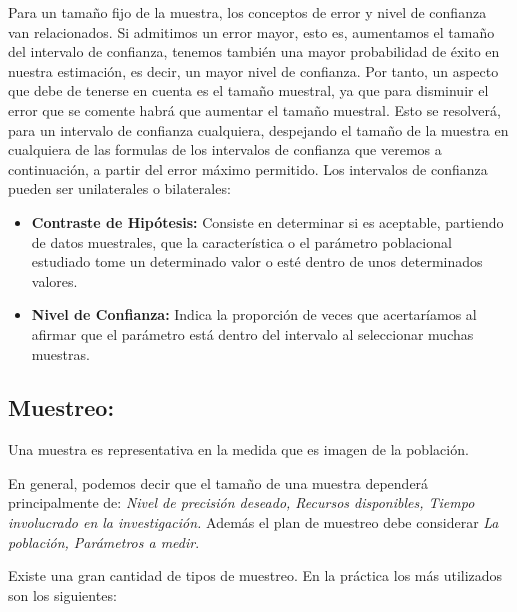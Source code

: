 Para un tama\~no fijo de la muestra, los conceptos de error y nivel de confianza van relacionados. Si admitimos un error mayor, esto es, aumentamos el tama\~no del intervalo de confianza, tenemos tambi\'en una mayor probabilidad de \'exito en nuestra estimaci\'on, es decir, un mayor nivel de confianza. Por tanto, un aspecto que debe de tenerse en cuenta es el tama\~no muestral, ya que para disminuir el error que se comente habr\'a que aumentar el tama\~no muestral. Esto se resolver\'a, para un intervalo de confianza cualquiera, despejando el tama\~no de la muestra en cualquiera de las formulas de los intervalos de confianza que veremos a continuaci\'on, a partir del error m\'aximo permitido. Los intervalos de confianza pueden ser unilaterales o bilaterales:

\begin{itemize}
    \item \textbf{Contraste de Hip\'otesis:} Consiste en determinar si es aceptable, partiendo de datos muestrales, que la caracter\'istica o el par\'ametro poblacional estudiado tome un determinado valor o est\'e dentro de unos determinados valores.
    \item \textbf{Nivel de Confianza:} Indica la proporci\'on de veces que acertar\'iamos al afirmar que el par\'ametro est\'a dentro del intervalo al seleccionar muchas muestras.
\end{itemize}

\subsection{Muestreo:} 

Una muestra es representativa en la medida que es imagen de la poblaci\'on. 

En general, podemos decir que el tama\~no de una muestra depender\'a principalmente de: \textit{Nivel de precisi\'on deseado, Recursos disponibles, Tiempo involucrado en la investigaci\'on.} Adem\'as el plan de muestreo debe considerar \textit{La poblaci\'on, Par\'ametros a medir}.

Existe una gran cantidad de tipos de muestreo. En la pr\'actica los m\'as utilizados son los siguientes:

